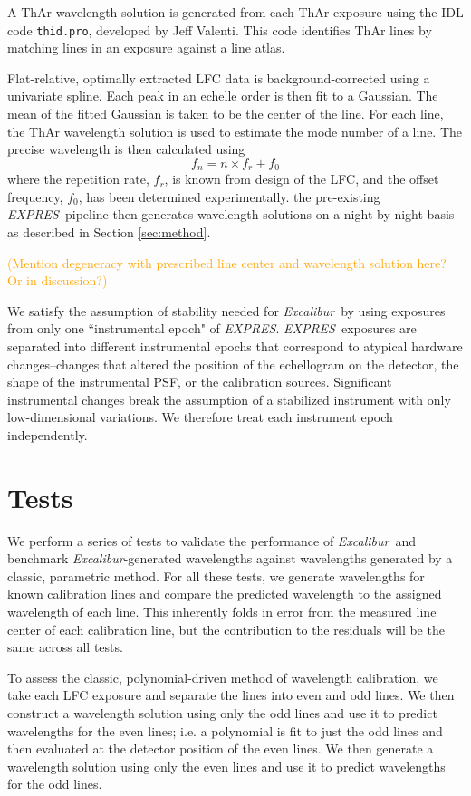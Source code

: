 \documentclass[twocolumn]{aastex63}
\newcommand{\lz}[1]{\textcolor{orange}{#1}}
\newcommand{\project}[1]{\textsl{#1}}
\newcommand{\name}{\project{Excalibur}}
\newcommand{\acronym}[1]{{\small{#1}}}
\newcommand{\expres}{\project{\acronym{EXPRES}}}
\begin{document}
 A ThAr wavelength solution is generated from each ThAr exposure using the IDL code \texttt{thid.pro}, developed by Jeff Valenti.  This code identifies ThAr lines by matching lines in an exposure against a line atlas. 
 
 Flat-relative, optimally extracted LFC data is background-corrected using a univariate spline.  Each peak in an echelle order is then fit to a Gaussian.  The mean of the fitted Gaussian is taken to be the center of the line.  For each line, the ThAr wavelength solution is used to estimate the mode number of a line.  The precise wavelength is then calculated using
 \begin{equation}
 f_n = n \times  f_r + f_0
 \label{eq:lfc}
 \end{equation}
 where the repetition rate, $f_r$, is known from design of the LFC, and the offset frequency, $f_0$, has been determined experimentally.  the pre-existing \expres\ pipeline then generates wavelength solutions on a night-by-night basis as described in Section \ref{sec:method}.
 
 \lz{(Mention degeneracy with prescribed line center and wavelength solution here?  Or in discussion?)}
 
 We satisfy the assumption of stability needed for \name\ by using exposures from only one ``instrumental epoch" of \expres.  \expres\ exposures are separated into different instrumental epochs that correspond to atypical hardware changes--changes that altered the position of the echellogram on the detector, the shape of the instrumental PSF, or the calibration sources.  Significant instrumental changes break the assumption of a stabilized instrument with only low-dimensional variations.  We therefore treat each instrument epoch independently.


\section{Tests}\label{sec:tests}
We perform a series of tests to validate the performance of \name\ and benchmark \name -generated wavelengths against wavelengths generated by a classic, parametric method.  For all these tests, we generate wavelengths for known calibration lines and compare the predicted wavelength to the assigned wavelength of each line.  This inherently folds in error from the measured line center of each calibration line, but the contribution to the residuals will be the same across all tests.

To assess the classic, polynomial-driven method of wavelength calibration, we take each LFC exposure and separate the lines into even and odd lines.  We then construct a wavelength solution using only the odd lines and use it to predict wavelengths for the even lines; i.e. a polynomial is fit to just the odd lines and then evaluated at the detector position of the even lines.  We then generate a wavelength solution using only the even lines and use it to predict wavelengths for the odd lines.
\end{document}
